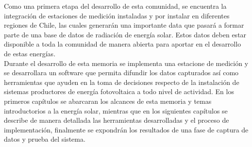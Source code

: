 Como una primera etapa del desarrollo de esta comunidad, se encuentra la integración de estaciones de medición instaladas y por instalar en diferentes regiones de Chile, las cuales generarán una importante data que pasará a formar parte de una base de datos de radiación de energía solar. Estos datos deben estar disponible a toda la comunidad de manera abierta para aportar en el desarrollo de estas energías.\\

Durante el desarrollo de esta memoria se implementa una estacione de medición y se desarrollara un software que permita difundir los datos capturados así como herramientas que ayuden en la toma de decisiones respecto de la instalación de sistemas productores de energía fotovoltaica a todo nivel de actividad. En los primeros capítulos se abarcaran los alcances de esta memoria y temas introductorios a la energía solar, mientras que en los siguientes capítulos se describe de manera detallada las herramientas desarrolladas y el proceso de implementación, finalmente se expondrán los resultados de una fase de captura de datos y prueba del sistema.
